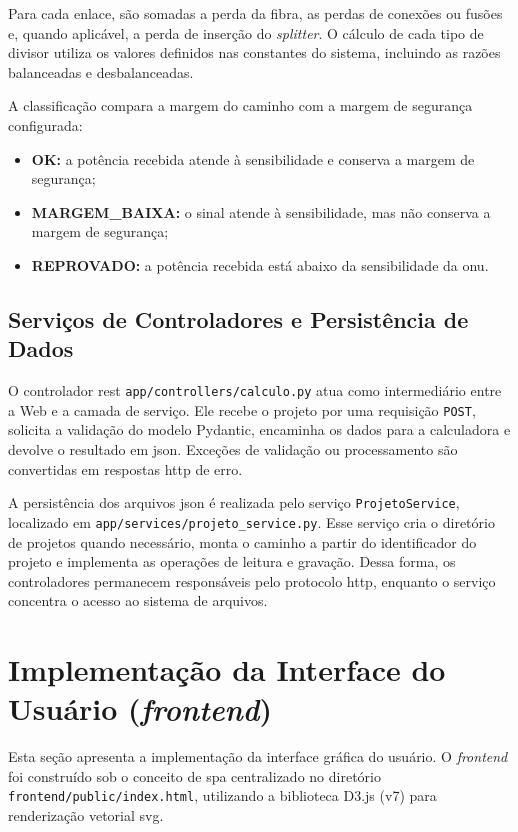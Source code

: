 Para cada enlace, são somadas a perda da fibra, as perdas de conexões ou fusões e, quando aplicável, a perda de inserção do \textit{splitter}. O cálculo de cada tipo de divisor utiliza os valores definidos nas constantes do sistema, incluindo as razões balanceadas e desbalanceadas.

A classificação compara a margem do caminho com a margem de segurança configurada:
\begin{itemize}
    \item \textbf{OK:} a potência recebida atende à sensibilidade e conserva a margem de segurança;
    \item \textbf{MARGEM\_BAIXA:} o sinal atende à sensibilidade, mas não conserva a margem de segurança;
    \item \textbf{REPROVADO:} a potência recebida está abaixo da sensibilidade da \gls{onu}.
\end{itemize}

\subsection{Serviços de Controladores e Persistência de Dados}

O controlador \gls{rest} \texttt{app/controllers/calculo.py} atua como intermediário entre a Web e a camada de serviço. Ele recebe o projeto por uma requisição \texttt{POST}, solicita a validação do modelo Pydantic, encaminha os dados para a calculadora e devolve o resultado em \gls{json}. Exceções de validação ou processamento são convertidas em respostas \gls{http} de erro.

A persistência dos arquivos \gls{json} é realizada pelo serviço \texttt{ProjetoService}, localizado em \texttt{app/services/projeto\_service.py}. Esse serviço cria o diretório de projetos quando necessário, monta o caminho a partir do identificador do projeto e implementa as operações de leitura e gravação. Dessa forma, os controladores permanecem responsáveis pelo protocolo \gls{http}, enquanto o serviço concentra o acesso ao sistema de arquivos.


\section{Implementação da Interface do Usuário (\textit{frontend})}

Esta seção apresenta a implementação da interface gráfica do usuário. O \textit{frontend} foi construído sob o conceito de \gls{spa} centralizado no diretório \texttt{frontend/public/index.html}, utilizando a biblioteca D3.js (v7) para renderização vetorial \gls{svg}.

